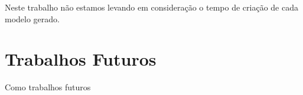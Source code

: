\documentclass[
	12pt,				%
	openright,			%
	oneside,	
	a4paper,				%
	english,				%
	brazil				%
]{abntex2/abntex2} %
\begin{document}
	Neste trabalho não estamos levando em consideração o tempo de criação de cada modelo gerado.
	
	\section{Trabalhos Futuros}
	
	Como trabalhos futuros

\postextual
{}
%









\begin{anexosenv}



%

\end{anexosenv}
\end{document}
